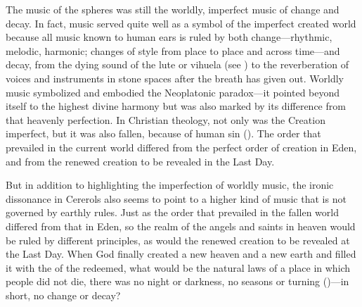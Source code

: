 The music of the spheres was still the worldly, imperfect music of change and
decay.
In fact, music served quite well as a symbol of the imperfect created world
because all music known to human ears is ruled by both change---rhythmic,
melodic, harmonic; changes of style from place to place and across time---and
decay, from the dying sound of the lute or vihuela (see ) to
the reverberation of voices and instruments in stone spaces after the breath has
given out.
Worldly music symbolized and embodied the Neoplatonic paradox---it pointed
beyond itself to the highest divine harmony but was also marked by its
difference from that heavenly perfection.
In Christian theology, not only was the Creation imperfect, but it was also
fallen,  because of human sin 
().
The order that prevailed in the current world differed from the perfect order
of creation in Eden, and from the renewed creation to be revealed in the Last
Day.

But in addition to highlighting the imperfection of worldly music, the ironic
dissonance in Cererols also seems to point to a higher kind of music that is
not governed by earthly rules.
Just as the order that prevailed in the fallen world differed from that in
Eden, so the realm of the angels and saints in heaven would be ruled by
different principles, as would the renewed creation to be revealed at the Last
Day.
When God finally created a new heaven and a new earth and filled it with the
 of the redeemed, what would be the natural laws of a
place in which people did not die, there was no night or darkness, no seasons or
turning ()---in short, no change or decay?



